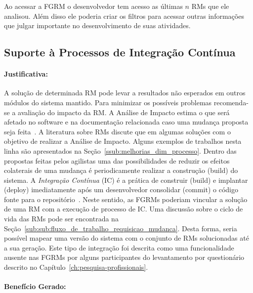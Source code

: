 Ao acessar a FGRM o desenvolvedor tem acesso as últimas $n$ RMs que ele
analisou. Além disso ele poderia criar os filtros para acessar outras
informações que julgar importante no desenvolvimento de suas atividades.

\subsection{Suporte à Processos de Integração Contínua}
\label{sub:suporte_integracao_continua}


\paragraph{Justificativa:}
\label{par:justificativa_s05}

A solução de determinada RM pode levar a resultados não esperados em outros
módulos do sistema mantido. Para minimizar os possíveis problemas recomenda-se a
avaliação do impacto da RM\@. A Análise de Impacto estima o que será afetado no
software e na documentação relacionada caso uma mudança proposta seja
feita~\cite{arnold1996software}. A literatura sobre RMs discute que em algumas
soluções com o objetivo de realizar a Análise de Impacto. Alguns exemplos de
trabalhos nesta linha são apresentados na
Seção~\ref{ssub:melhorias_dim_processo}. Dentro das propostas feitas pelos
agilistas uma das possibilidades de reduzir os efeitos colaterais de uma mudança
é periodicamente realizar a construção (build) do sistema. A \textit{Integração
    Contínua} (IC) é a prática de construir (build) e implantar (deploy)
imediatamente após um desenvolvedor consolidar (commit) o código fonte para o
repositório~\cite{aiello2010configuration}. Neste sentido, as FGRMs poderiam
vincular a solução de uma RM com a execução de processo de IC\@. Uma discussão
sobre o ciclo de vida das RMs pode ser encontrada na
Seção~\ref{sub:sub:fluxo_de_trabalho_requisicao_mudanca}. Desta forma, seria
possível mapear uma versão do sistema com o conjunto de RMs solucionadas até a
sua geração. Este tipo de integração foi descrita como uma funcionalidade
ausente nas FGRMs por alguns participantes do levantamento por questionário
descrito no Capítulo~\ref{ch:pesquisa-profissionais}.

\paragraph{Benefício Gerado:}
\label{par:papéis_afetados_s05}

